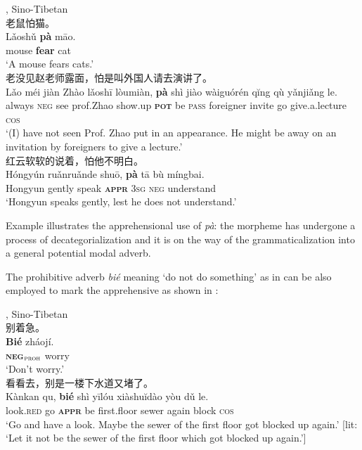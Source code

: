 \documentclass[output=paper,colorlinks,citecolor=brown, language=chinese]{langscibook}
\begin{document}
\ea \label{ex:Song5} 
 {, Sino-Tibetan} {\cite{Gao2003}} \\
\ea \label{ex:Song5a} {\cn 老鼠怕猫。}\\
\gll Lǎoshǔ	\textbf{pà} māo. \\
mouse \textbf{fear} cat \\
\glt `A mouse fears cats.' \\
\ex \label{ex:Song5b} {\cn 老没见赵老师露面，怕是叫外国人请去演讲了。} \\
\gll Lǎo méi jiàn {Zhào lǎoshī} lòumiàn, \textbf{pà} shì jiào wàiguórén qĭng qù yǎnjiǎng le. \\
always \textsc{neg} see prof.Zhao show.up \textbf{\textsc{pot}} be \textsc{pass} foreigner invite go give.a.lecture \textsc{cos} \\
\glt `(I) have not seen Prof. Zhao put in an appearance. He might be away on an invitation by foreigners to give a lecture.' \\
\ex \label{ex:Song5c} {\cn 红云软软的说着，怕他不明白。}\\
\gll Hóngyún ruǎnruǎnde shuō, \textbf{pà} tā bù míngbai. \\
Hongyun gently speak \textsc{\textbf{appr}} \textsc{3sg} \textsc{neg} understand \\
\glt `Hongyun speaks gently, lest he does not understand.'
\z
\z

\noindent Example  illustrates the apprehensional use of \textit{pà}: the morpheme has undergone a process of decategorialization \citep[104]{HopperTraugott1993} and it is on the way of the grammaticalization into a general potential modal adverb.

The prohibitive adverb \textit{bié} meaning `do not do something' as in  can be also employed to mark the apprehensive as shown in :

\newpage
\ea \label{ex:Song6} 
 {, Sino-Tibetan} {\cite{Gao2003}} \\
\ea \label{ex:Song6a} {\cn 别着急。}\\
\gll \textbf{Bié} zháojí. \\
\textbf{\textsc{neg$_{\mathrm{\textsc{proh}}}$}} worry \\
\glt `Don't worry.' \\
\ex \label{ex:Song6b} {\cn 看看去，别是一楼下水道又堵了。}\\
\gll Kànkan qu, \textbf{bié} shì yīlóu xiàshuĭdào yòu dǔ le.  \\
look.\textsc{red} go \textsc{\textbf{appr}} be first.floor sewer again block \textsc{cos} \\
\glt `Go and have a look. Maybe the sewer of the first floor got blocked up again.' [lit: `Let it not be the sewer of the first floor which got blocked up again.']
\z
\z
\end{document}
